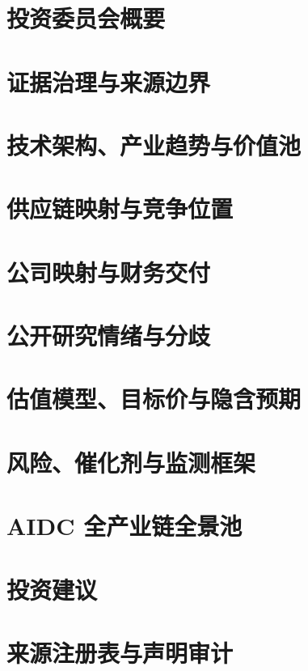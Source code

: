 \documentclass[a4paper,11pt,openany,fontset=none]{ctexrep}
\begin{document}
\astockcover
\tableofcontents
\clearpage

\chapter{投资委员会概要}

\chapter{证据治理与来源边界}

\chapter{技术架构、产业趋势与价值池}

\chapter{供应链映射与竞争位置}

\chapter{公司映射与财务交付}

\chapter{公开研究情绪与分歧}

\chapter{估值模型、目标价与隐含预期}

\chapter{风险、催化剂与监测框架}

\chapter{AIDC 全产业链全景池}


\chapter{投资建议}


\appendix
\chapter{来源注册表与声明审计}

\end{document}
